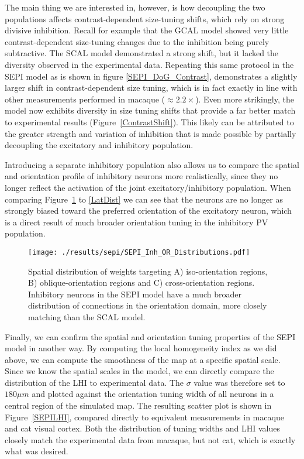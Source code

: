 The main thing we are interested in, however, is how decoupling the
two populations affects contrast-dependent size-tuning shifts, which
rely on strong divisive inhibition. Recall for example that the GCAL
model showed very little contrast-dependent size-tuning changes due to
the inhibition being purely subtractive. The SCAL model demonstrated a
strong shift, but it lacked the diversity observed in the experimental
data. Repeating this same protocol in the SEPI model as is shown in
figure \ref{SEPI_DoG_Contrast}, demonstrates a slightly larger shift
in contrast-dependent size tuning, which is in fact exactly in line
with other measurements performed in macaque ($\approx
2.2\times$). Even more strikingly, the model now exhibits diversity in
size tuning shifts that provide a far better match to experimental
results (Figure~\ref{ContrastShift}). This likely can be attributed to
the greater strength and variation of inhibition that is made possible
by partially decoupling the excitatory and inhibitory population.


Introducing a separate inhibitory population also allows us to compare
the spatial and orientation profile of inhibitory neurons more
realistically, since they no longer reflect the activation of the
joint excitatory/inhibitory population. When comparing
Figure~\ref{SEPI_OR_Distributions} to \ref{LatDist} we can see
that the neurons are no longer as strongly biased toward the preferred
orientation of the excitatory neuron, which is a direct result of much
broader orientation tuning in the inhibitory PV population.

\begin{figure}
	\centering
        \texttt{[image: ./results/sepi/SEPI\_Inh\_OR\_Distributions.pdf]}
	\caption{Spatial distribution of weights targeting A)
      iso-orientation regions, B) oblique-orientation regions and C)
      cross-orientation regions. Inhibitory neurons in the SEPI model
      have a much broader distribution of connections in the
      orientation domain, more closely matching \cite{Kisvarday1997a}
      than the SCAL model.}
	\label{SEPI_OR_Distributions}
\end{figure}

Finally, we can confirm the spatial and orientation tuning properties
of the SEPI model in another way. By computing the local homogeneity
index as we did above, we can compute the smoothness of the map at a
specific spatial scale. Since we know the spatial scales in the model,
we can directly compare the distribution of the LHI to experimental
data. The $\sigma$ value was therefore set to $180 \mu m$ and plotted
against the orientation tuning width of all neurons in a central
region of the simulated map. The resulting scatter plot is shown in
Figure~\ref{SEPILHI}, compared directly to equivalent measurements in
macaque and cat visual cortex. Both the distribution of tuning widths
and LHI values closely match the experimental data from macaque, but
not cat, which is exactly what was desired.

